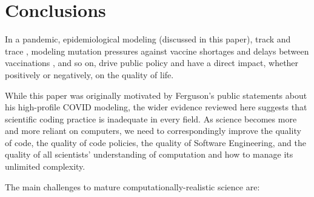 \documentclass{comjnl}
\begin{document}

\section{Conclusions}
In a pandemic, epidemiological modeling (discussed in this paper), track and trace \cite{excel-fiasco}, modeling mutation pressures against vaccine shortages and delays between vaccinations \cite{science-delays}, and so on, drive public policy and have a direct impact, whether positively or negatively, on the quality of life. 

While this paper was originally motivated by Ferguson's public statements  about his high-profile COVID modeling, the wider evidence reviewed here suggests that scientific coding practice is inadequate in every field. As science becomes more and more reliant on computers, we need to correspondingly improve the quality of code, the quality of code policies, the quality of Software Engineering, and the quality of all scientists' understanding of computation and how to manage its unlimited complexity. 

The main challenges to mature computationally-realistic science are:
\end{document}
